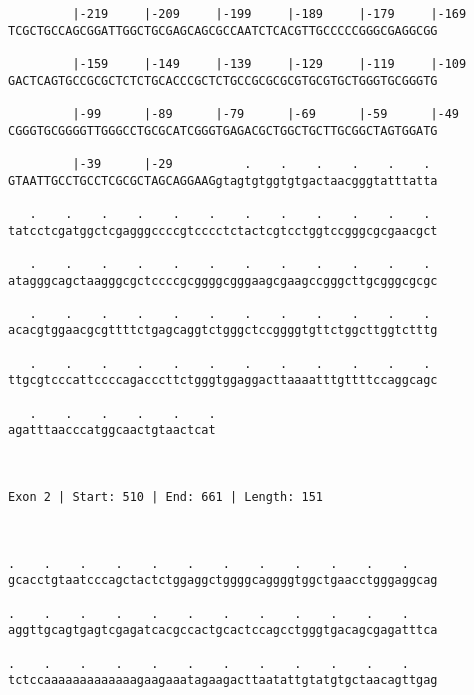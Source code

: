 \documentclass{article}
\begin{document}
\begin{Verbatim}
         |-219     |-209     |-199     |-189     |-179     |-169
TCGCTGCCAGCGGATTGGCTGCGAGCAGCGCCAATCTCACGTTGCCCCCGGGCGAGGCGG
                                                            
         |-159     |-149     |-139     |-129     |-119     |-109
GACTCAGTGCCGCGCTCTCTGCACCCGCTCTGCCGCGCGCGTGCGTGCTGGGTGCGGGTG
                                                            
         |-99      |-89      |-79      |-69      |-59      |-49
CGGGTGCGGGGTTGGGCCTGCGCATCGGGTGAGACGCTGGCTGCTTGCGGCTAGTGGATG
                                                            
         |-39      |-29          .    .    .    .    .    . 
GTAATTGCCTGCCTCGCGCTAGCAGGAAGgtagtgtggtgtgactaacgggtatttatta
                                                            
   .    .    .    .    .    .    .    .    .    .    .    . 
tatcctcgatggctcgagggccccgtcccctctactcgtcctggtccgggcgcgaacgct
                                                            
   .    .    .    .    .    .    .    .    .    .    .    . 
atagggcagctaagggcgctccccgcggggcgggaagcgaagccgggcttgcgggcgcgc
                                                            
   .    .    .    .    .    .    .    .    .    .    .    . 
acacgtggaacgcgttttctgagcaggtctgggctccggggtgttctggcttggtctttg
                                                            
   .    .    .    .    .    .    .    .    .    .    .    . 
ttgcgtcccattccccagacccttctgggtggaggacttaaaatttgttttccaggcagc
                                                            
   .    .    .    .    .    .
agatttaacccatggcaactgtaactcat
                             
                             
 
Exon 2 | Start: 510 | End: 661 | Length: 151



.    .    .    .    .    .    .    .    .    .    .    .    
gcacctgtaatcccagctactctggaggctggggcaggggtggctgaacctgggaggcag
                                                            
.    .    .    .    .    .    .    .    .    .    .    .    
aggttgcagtgagtcgagatcacgccactgcactccagcctgggtgacagcgagatttca
                                                            
.    .    .    .    .    .    .    .    .    .    .    .    
tctccaaaaaaaaaaaaagaagaaatagaagacttaatattgtatgtgctaacagttgag
                                                            

\end{Verbatim}
\end{document}
